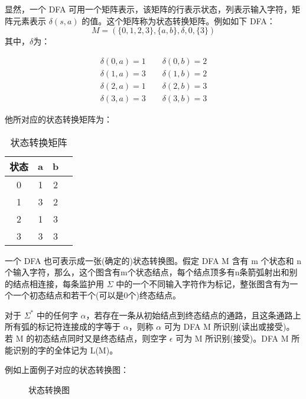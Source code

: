 显然，一个 DFA 可用一个矩阵表示，该矩阵的行表示状态，列表示输入字符，矩阵元素表示 $\delta(s,a)$ 的值。这个矩阵称为状态转换矩阵。例如如下 DFA：
\[ M = (\{0,1,2,3\},\{a,b\},\delta,0,\{3\}) \]
其中，$\delta$为：

\begin{equation}
    \begin{aligned}
        \delta(0,a) = 1 \qquad \delta(0,b) = 2 \\ 
        \delta(1,a) = 3 \qquad \delta(1,b) = 2 \\ 
        \delta(2,a) = 1 \qquad \delta(2,b) = 3 \\ 
        \delta(3,a) = 3 \qquad \delta(3,b) = 3 \nonumber
    \end{aligned}
\end{equation}

他所对应的状态转换矩阵为：
\begin{table}[H]
    \centering
    \caption{状态转换矩阵}
    \label{table:状态转换矩阵}
    \setlength{\tabcolsep}{15mm}
    \begin{tabular}{c|ccc}
        \toprule
        \textbf{状态} & \textbf{a} & \textbf{b}\\
        \midrule
        0 & 1 & 2 \\
        1 & 3 & 2 \\
        2 & 1 & 3 \\
        3 & 3 & 3 \\
        \bottomrule
    \end{tabular}
\end{table}

一个 DFA 也可表示成一张(确定的)状态转换图。假定 DFA M 含有 m 个状态和 n 个输入字符，那么，这个图含有m个状态结点，每个结点顶多有n条箭弧射出和别的结点相连接，每条监护用 $\Sigma$ 中的一个不同输入字符作为标记，整张图含有为一个一个初态结点和若干个(可以是0个)终态结点。

对于 $\Sigma^*$ 中的任何字 $\alpha$，若存在一条从初始结点到终态结点的通路，且这条通路上所有弧的标记符连接成的字等于 $\alpha$，则称 $\alpha$ 可为 DFA M 所识别(读出或接受)。若 M 的初态结点同时又是终态结点，则空字 $\epsilon$ 可为 M 所识别(接受)。DFA M 所能识别的字的全体记为 L(M)。

例如上面例子对应的状态转换图：

\begin{figure}[H]
    \centering
    \caption{状态转换图}
    \label{fig:状态转换图}
\end{figure}

